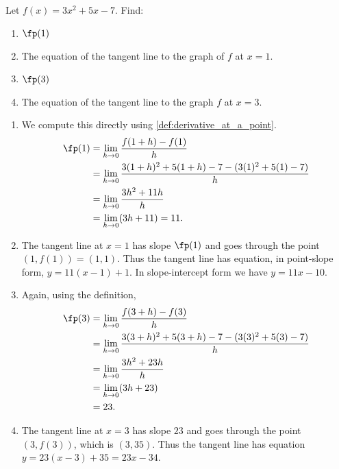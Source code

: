 \begin{example}\label{ex_derv_point1}
Let $f(x) = 3x^2+5x-7$. Find: 
\begin{multicols}{2}
	\begin{enumerate}
	\item		$\fp(1)$
	\item		The equation of the tangent line to the graph of $f$ at $x=1$.
	\item		$\fp(3)$
	\item		The equation of the tangent line to the graph $f$ at $x=3$.
	\end{enumerate}
	\end{multicols}
\solution
	\begin{enumerate}
	\item We compute this directly using \autoref{def:derivative_at_a_point}.
		\begin{align*}
			\fp(1) &= \lim_{h\to 0} \frac{f(1+h)-f(1)}{h} \\
				   &= \lim_{h\to 0} \frac{3(1+h)^2+5(1+h)-7 - (3(1)^2+5(1)-7)}{h}\\
				   &= \lim_{h\to 0} \frac{3h^2+11h}{h}\\
				   &= \lim_{h\to 0}(3h+11)=11.%
		\end{align*}
	\item The tangent line at $x=1$ has slope $\fp(1)$ and goes through the point $(1,f(1)) = (1,1)$. Thus the tangent line has equation, in point-slope form, $y = 11(x-1) + 1$. In slope-intercept form we have $y = 11x-10$.
	\item Again, using the definition,
		\begin{align*}
			\fp(3) &= \lim_{h\to 0} \frac{f(3+h)-f(3)}{h} \\
				   &= \lim_{h\to 0} \frac{3(3+h)^2+5(3+h)-7 - (3(3)^2+5(3)-7)}{h} \\
				   &= \lim_{h\to 0} \frac{3h^2+23h}{h}\\
				   &= \lim_{h\to 0}(3h+23)\\
				   &= 23.
		\end{align*}
	\item The tangent line at $x=3$ has slope $23$ and goes through the point $(3,f(3))$, which is $(3,35)$. Thus the tangent line has equation $y=23(x-3)+35 = 23x-34$.
	\end{enumerate}


\end{example}
